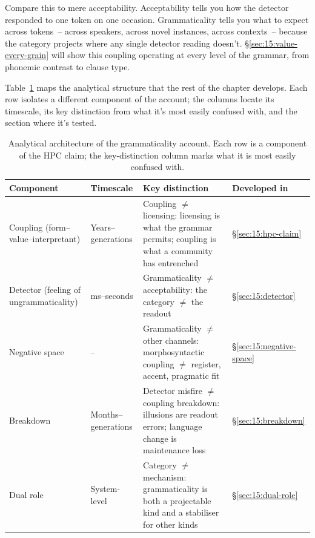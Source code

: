 Compare this to mere acceptability. Acceptability tells you how the detector responded to one token on one occasion. Grammaticality tells you what to expect across tokens~-- across speakers, across novel instances, across contexts~-- because the category projects where any single detector reading doesn't. §\ref{sec:15:value-every-grain} will show this coupling operating at every level of the grammar, from phonemic contrast to clause type.

Table~\ref{tab:15:architecture} maps the analytical structure that the rest of the chapter develops. Each row isolates a different component of the account; the columns locate its timescale, its key distinction from what it's most easily confused with, and the section where it's tested.

\begin{table}[h]
\centering
\small
\begin{tabular}{@{}>{\raggedright\arraybackslash}p{}>{\raggedright\arraybackslash}p{}>{\raggedright\arraybackslash}p{}>{\raggedright\arraybackslash}p{}@{}}
\toprule
\textbf{Component} & \textbf{Timescale} & \textbf{Key distinction} & \textbf{Developed in} \\
\midrule
Coupling (form--value--interpretant) & Years--generations & Coupling $\neq$ licensing: licensing is what the grammar permits; coupling is what a community has entrenched & §\ref{sec:15:hpc-claim} \\
Detector (feeling of ungrammaticality) & 100 ms--seconds & Grammaticality $\neq$ acceptability: the category $\neq$ the readout & §\ref{sec:15:detector} \\
Negative space & -- & Grammaticality $\neq$ other channels: morphosyntactic coupling $\neq$ register, accent, pragmatic fit & §\ref{sec:15:negative-space} \\
Breakdown & Months--generations & Detector misfire $\neq$ coupling breakdown: illusions are readout errors; language change is maintenance loss & §\ref{sec:15:breakdown} \\
Dual role & System-level & Category $\neq$ mechanism: grammaticality is both a projectable kind and a stabiliser for other kinds & §\ref{sec:15:dual-role} \\
\bottomrule
\end{tabular}
\caption{Analytical architecture of the grammaticality account. Each row is a component of the HPC claim; the key-distinction column marks what it is most easily confused with.}
\label{tab:15:architecture}
\end{table}


